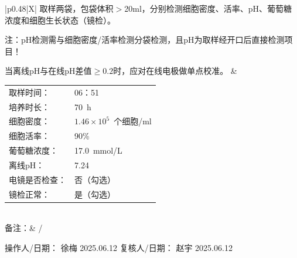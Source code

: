 \documentclass[UTF8,10pt,a4paper,fontset=fandol]{ctexart}
\newcommand{\fieldvalue}[1]{#1}
\newcommand{\handwritten}[1]{#1}
\begin{document}
\begin{tabularx}{\textwidth}{|p{}|X|}
取样两袋，包袋体积$>$20ml，分别检测细胞密度、活率、pH、葡萄糖浓度和细胞生长状态（镜检）。

注：pH检测需与细胞密度/活率检测分袋检测，且pH为取样经开口后直接检测项目！

当离线pH与在线pH差值$\geq0.2$时，应对在线电极做单点校准。
&
\begin{tabular}{@{}ll@{}}
取样时间：&
\fieldvalue{\handwritten{06：51}}\\
培养时长：&
\fieldvalue{\handwritten{70}}\ h\\
细胞密度：&
\fieldvalue{\handwritten{$1.46\times10^{5}$}}\ 个细胞/ml\\
细胞活率：&
\fieldvalue{\handwritten{90}}\%\\
葡萄糖浓度：&
\fieldvalue{\handwritten{17.0}}\ mmol/L\\
离线pH：&
\fieldvalue{\handwritten{7.24}}\\
电镜是否检查：&
\fieldvalue{\handwritten{否（勾选）}}\\
镜检正常：&
\fieldvalue{\handwritten{是（勾选）}}
\end{tabular}
\\
\hline
备注：&
\handwritten{/}
\\
\hline
\end{tabularx}

\vspace{2mm}

\noindent
操作人/日期：
\fieldvalue{\handwritten{徐梅}}
\quad
\fieldvalue{\handwritten{2025.06.12}}
\qquad
复核人/日期：
\fieldvalue{\handwritten{赵宇}}
\quad
\fieldvalue{\handwritten{2025.06.12}}
\end{document}
